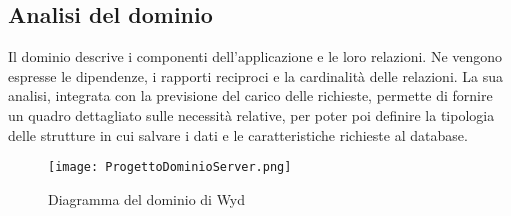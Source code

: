 \subsection{Analisi del dominio}

Il dominio descrive i componenti dell'applicazione e le loro relazioni.
Ne vengono espresse le dipendenze, i rapporti reciproci e la cardinalità delle relazioni.
La sua analisi, integrata con la previsione del carico delle richieste,
permette di fornire un quadro dettagliato sulle necessità relative,
per poter poi definire la tipologia delle strutture in cui salvare i dati e
le caratteristiche richieste al database.\\

\begin{figure}[htpb]
    \centering
    \texttt{[image: ProgettoDominioServer.png]}
    \caption{Diagramma del dominio di Wyd}
\end{figure}

